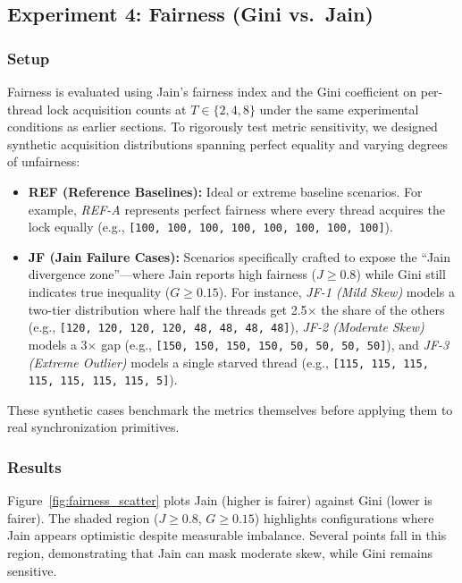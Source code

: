 \documentclass[conference]{IEEEtran}
\begin{document}
\subsection{Experiment 4: Fairness (Gini vs.\ Jain)}
\label{sec:fairness}

\subsubsection{Setup}
Fairness is evaluated using Jain's fairness index and the Gini coefficient on per-thread lock acquisition counts at $T\in\{2,4,8\}$ under the same experimental conditions as earlier sections. To rigorously test metric sensitivity, we designed synthetic acquisition distributions spanning perfect equality and varying degrees of unfairness:
\begin{itemize}
    \item \textbf{REF (Reference Baselines):} Ideal or extreme baseline scenarios. For example, \emph{REF-A} represents perfect fairness where every thread acquires the lock equally (e.g., \texttt{[100, 100, 100, 100, 100, 100, 100, 100]}).
    \item \textbf{JF (Jain Failure Cases):} Scenarios specifically crafted to expose the ``Jain divergence zone''---where Jain reports high fairness ($J \geq 0.8$) while Gini still indicates true inequality ($G \geq 0.15$). For instance, \emph{JF-1 (Mild Skew)} models a two-tier distribution where half the threads get 2.5$\times$ the share of the others (e.g., \texttt{[120, 120, 120, 120, 48, 48, 48, 48]}), \emph{JF-2 (Moderate Skew)} models a 3$\times$ gap (e.g., \texttt{[150, 150, 150, 150, 50, 50, 50, 50]}), and \emph{JF-3 (Extreme Outlier)} models a single starved thread (e.g., \texttt{[115, 115, 115, 115, 115, 115, 115, 5]}).
\end{itemize}
These synthetic cases benchmark the metrics themselves before applying them to real synchronization primitives.

\subsubsection{Results}
Figure~\ref{fig:fairness_scatter} plots Jain (higher is fairer) against Gini (lower is fairer). The shaded region ($J \geq 0.8$, $G \geq 0.15$) highlights configurations where Jain appears optimistic despite measurable imbalance. Several points fall in this region, demonstrating that Jain can mask moderate skew, while Gini remains sensitive.
\end{document}
